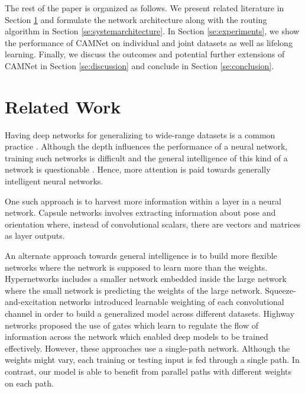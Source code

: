 \documentclass[10pt,twocolumn,letterpaper]{article}
\begin{document}
The rest of the paper is organized as follows. We present related literature in Section \ref{se:relatedwork} and formulate the network architecture along with the routing algorithm in Section \ref{se:systemarchitecture}. In Section \ref{se:experiments}, we show the performance of CAMNet on individual and joint datasets as well as lifelong learning. 
Finally, we discuss the outcomes and potential further extensions of CAMNet in Section \ref{se:discussion} and conclude in Section \ref{se:conclusion}.  



\section{Related Work}
\label{se:relatedwork}
\vspace{-0.05in}
Having deep networks for generalizing to wide-range datasets is a common practice
. Although the depth influences the performance of a neural network, training such networks is difficult and the general intelligence of this kind of a network is questionable \cite{srivastava2015highway}. Hence, more attention is paid towards generally intelligent neural networks. 

One such approach is to harvest more information within a layer in a neural network. Capsule networks \cite{emrouting,sabour2017dynamic} involves extracting information about pose and orientation where, instead of convolutional scalars, there are vectors and matrices as layer outputs. 

An alternate approach towards general intelligence is to build more flexible networks where the network is supposed to learn more than the weights. Hypernetworks \cite{ha2016hypernetworks} includes a smaller network embedded inside the large network where the small network is predicting the weights of the large network. Squeeze-and-excitation networks \cite{hu2017squeeze} introduced learnable weighting of each convolutional channel in order to build a generalized model across different datasets.  Highway networks \cite{srivastava2015highway} proposed the use of gates which learn to regulate the flow of information across the network which enabled deep models to be trained effectively. However, these approaches use a single-path network. Although the weights might vary, each training or testing input is fed through a single path. In contrast, our model is able to benefit from parallel paths with different weights on each path.
\end{document}
